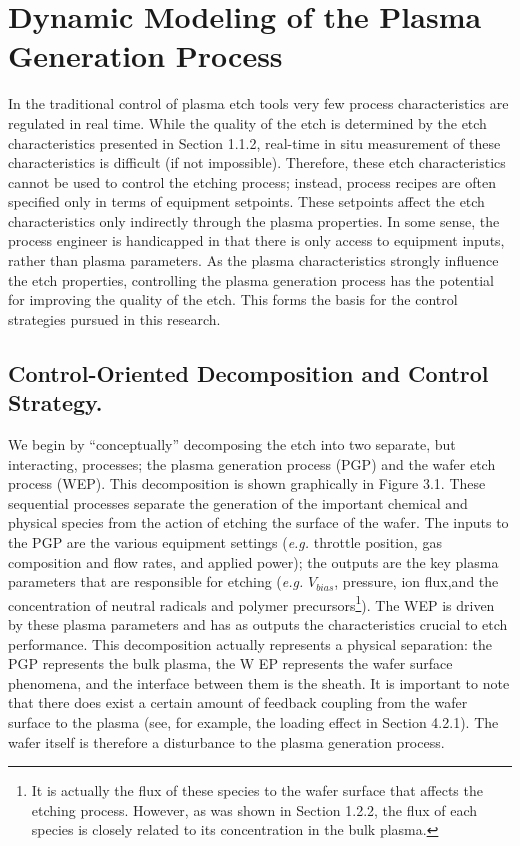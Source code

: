\chapter{Dynamic Modeling of the Plasma Generation Process}


\tab In the traditional control of plasma etch tools very few process characteristics are regulated in real time. While the quality of the etch is determined by the etch characteristics presented in Section 1.1.2, real-time in situ measurement of these characteristics is difficult (if not impossible). Therefore, these etch characteristics cannot be used to control the etching process; instead, process recipes are often specified only in terms of equipment setpoints. These setpoints affect the etch characteristics only indirectly through the plasma properties. In some sense, the process engineer is handicapped in that there is only access to equipment inputs, rather than plasma parameters. As the plasma characteristics strongly influence the etch properties, controlling the plasma generation process has the potential for improving the quality of the etch. This forms the basis for the control strategies pursued
in this research.

\section{Control-Oriented Decomposition and Control Strategy.}


\tab We begin by “conceptually” decomposing the etch into two separate, but interacting, processes; the plasma generation process (PGP) and the wafer etch process (WEP). This decomposition is shown graphically in Figure 3.1. These sequential processes separate the generation of the important chemical and physical species from the action of etching the surface of the wafer. The inputs to the PGP are the various equipment settings (\textit{e.g.} throttle position, gas composition and flow rates, and applied power); the outputs are the key plasma parameters that are responsible for etching (\textit{e.g.} $V_{bias}$, pressure, ion flux,and the concentration of neutral radicals and polymer precursors\footnote{It is actually the flux of these species to the wafer surface that affects the etching process. However, as was shown in Section 1.2.2, the flux of each species is closely related to its concentration in the bulk plasma.}). The WEP is driven by these plasma parameters and has as outputs the characteristics crucial to etch performance. This decomposition actually represents a physical separation: the PGP represents the bulk plasma, the W EP represents the wafer surface phenomena, and the interface between them is the sheath. It is important to note that there does exist a certain amount of feedback coupling from the wafer surface to the plasma (see, for example, the loading effect in Section 4.2.1). The wafer itself is therefore a disturbance to the plasma generation process.

